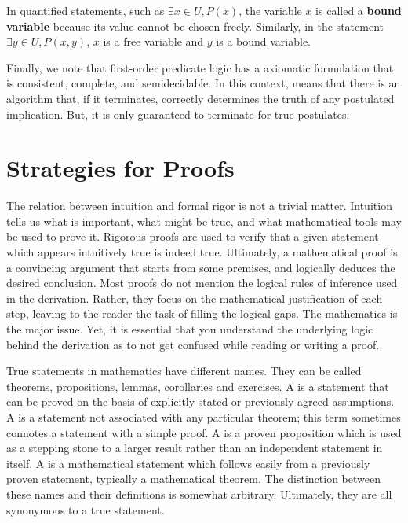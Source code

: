 In quantified statements, such as $\exists x\in U, P(x)$, the variable $x$ is called a \textbf{bound variable} because its value cannot be chosen freely.
Similarly, in the statement $\exists y \in U, P(x,y)$, $x$ is a free variable and $y$ is a bound variable.

Finally, we note that first-order predicate logic has a axiomatic formulation that is consistent, complete, and semidecidable.
In this context,  means that there is an algorithm that, if it terminates, correctly determines the truth of any postulated implication.
But, it is only guaranteed to terminate for true postulates.



\section{Strategies for Proofs}

The relation between intuition and formal rigor is not a trivial matter.
Intuition tells us what is important, what might be true, and what mathematical tools may be used to prove it.
Rigorous proofs are used to verify that a given statement which appears intuitively true is indeed true.
Ultimately, a mathematical proof is a convincing argument that starts from some premises, and logically deduces the desired conclusion.
Most proofs do not mention the logical rules of inference used in the derivation.
Rather, they focus on the mathematical justification of each step, leaving to the reader the task of filling the logical gaps.
The mathematics is the major issue.
Yet, it is essential that you understand the underlying logic behind the derivation as to not get confused while reading or writing a proof.

True statements in mathematics have different names.
They can be called theorems, propositions, lemmas, corollaries and exercises.
A  is a statement that can be proved on the basis of explicitly stated or previously agreed assumptions.
A  is a statement not associated with any particular theorem; this term sometimes connotes a statement with a simple proof.
A  is a proven proposition which is used as a stepping stone to a larger result rather than an independent statement in itself.
A  is a mathematical statement which follows easily from a previously proven statement, typically a mathematical theorem. 
The distinction between these names and their definitions is somewhat arbitrary.
Ultimately, they are all synonymous to a true statement.


